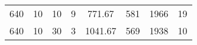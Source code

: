 \begin{table}[H]
\begin{tabular}{l|ccccccc}
 640                                                                  & 10                                                                                                                                                             & 10                                                                                                                               & 9                                                                                                                                                              & 771.67                                                                                                                           & 581                          & 1966                         & 19                                                                   \\
 640                                                                  & 10                                                                                                                                                             & 30                                                                                                                               & 3                                                                                                                                                              & 1041.67                                                                                                                          & 569                          & 1938                         & 10                                                                   \\
        \hline
    \end{tabular}
\end{table}